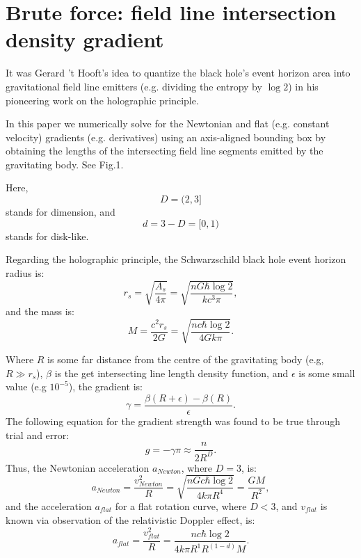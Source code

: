 \documentclass[12pt]{article}
\begin{document}
\section{Brute force: field line intersection density gradient}

It was Gerard 't Hooft's idea to quantize the black hole's event horizon area into gravitational field line emitters (e.g. dividing the entropy by $\log 2$) in his pioneering work on the holographic principle.

In this paper we numerically solve for the Newtonian and flat (e.g. constant velocity) gradients (e.g. derivatives) using an axis-aligned bounding box by obtaining the lengths of the intersecting field line segments emitted by the gravitating body. See Fig.1. 

Here, 
\begin{equation}
D = (2, 3]
\end{equation}
stands for dimension, and 
\begin{equation}
d = 3 - D = [0, 1)
\end{equation}
stands for disk-like.

Regarding the holographic principle, the Schwarzschild black hole event horizon radius is:
\begin{equation}
r_s = \sqrt{\frac{A_s}{4 \pi}} = \sqrt{\frac{n G \hbar \log 2}{k c^3 \pi}},
\end{equation}
and the mass is:
\begin{equation}
M = \frac{c^2 r_s}{2 G} = \sqrt{\frac{n c \hbar \log 2}{4 G k \pi}}. 
\end{equation}

Where $R$ is some far distance from the centre of the gravitating body (e.g, $R \gg r_s$), $\beta$ is the get intersecting line length density function, and $\epsilon$ is some small value (e.g $10^{-5}$), the gradient is:
\begin{equation}
\gamma = \frac{\beta(R + \epsilon) - \beta(R)}{\epsilon}.
\end{equation}
The following equation for the gradient strength was found to be true through trial and error:
\begin{equation}
g = -\gamma \pi \approx \frac{n}{2 R^D}.
\end{equation}
Thus, the Newtonian acceleration $a_{\textit{Newton}}$, where $D = 3$, is:
\begin{equation}
a_{\textit{Newton}} = \frac{v_{\textit{Newton}}^2}{R} = \sqrt{\frac{n G c \hbar \log 2}{4 k \pi R^4}} = \frac{GM}{R^2},
\end{equation}
and the acceleration $a_{\textit{flat}}$ for a flat rotation curve, where $D < 3$, and $v_{\textit{flat}}$ is known via observation of the relativistic Doppler effect, is:
\begin{equation}
a_{\textit{flat}} = \frac{v_{\textit{flat}}^2}{R} = \frac{n c \hbar \log 2}{4 k \pi R^1 R^{(1 - d)} M}.
\end{equation}
\end{document}
